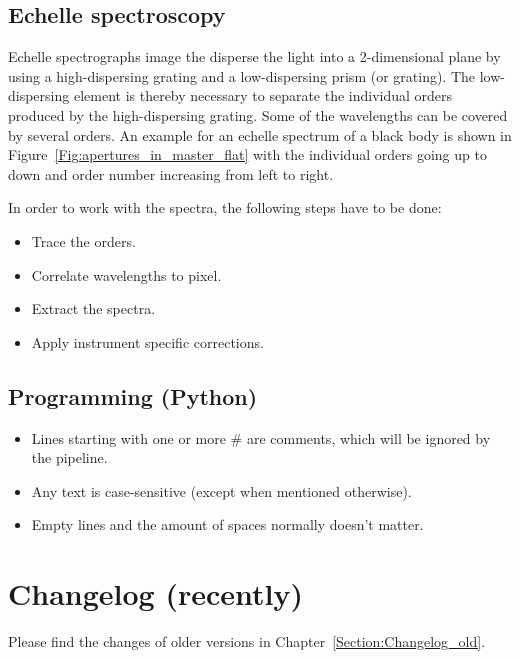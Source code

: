 \documentclass[10pt,a4paper]{article}
\begin{document}
\subsection{Echelle spectroscopy}
Echelle spectrographs image the disperse the light into a 2-dimensional plane by using a high-dispersing grating and a low-dispersing prism (or grating). The low-dispersing element is thereby necessary to separate the individual orders produced by the high-dispersing grating. Some of the wavelengths can be covered by several orders. An example for an echelle spectrum of a black body is shown in Figure~\ref{Fig:apertures_in_master_flat} with the individual orders going up to down and order number increasing from left to right.

In order to work with the spectra, the following steps have to be done:
\begin{itemize}
  \item Trace the orders.
  \item Correlate wavelengths to pixel.
  \item Extract the spectra.
  \item Apply instrument specific corrections.
\end{itemize}

\subsection{Programming (Python)}

\begin{itemize}
  \item Lines starting with one or more \# are comments, which will be ignored  by the pipeline.
  \item Any text is case-sensitive (except when mentioned otherwise).
  \item Empty lines and the amount of spaces normally doesn't matter.
\end{itemize}


\newpage

\section{Changelog (recently)}
\label{Section:Changelog_new}
Please find the changes of older versions in Chapter~\ref{Section:Changelog_old}.
\end{document}
